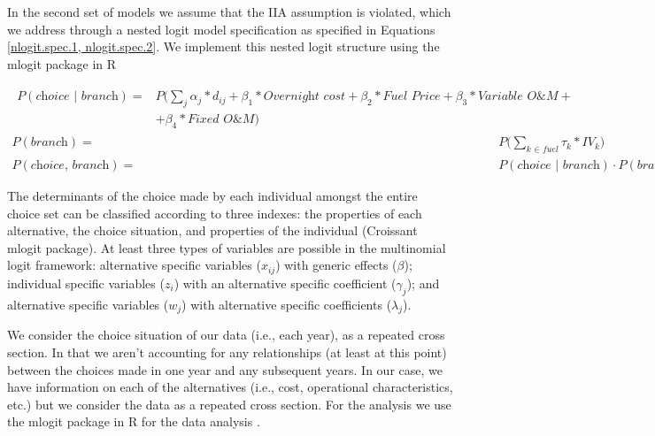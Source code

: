 \documentclass[10pt]{amsart}
\begin{document}
In the second set of models we assume that the IIA assumption is violated, which we address through a nested logit model specification as specified in Equations \ref{nlogit.spec.1, nlogit.spec.2}.
We implement this nested logit structure using the mlogit package in R \parencite{mlogit2013}


\begin{align}
\begin{split}\label{eq:1}
    P(\textit{choice $|$ branch})  ={}& P\Big(\sum_j \alpha_{j}*d_{ij} +\beta_1*\textit{Overnight cost} + \beta_2*\textit{Fuel Price} + \beta_3*\textit{Variable O\&M} + \\
         & + \beta_4*\textit{Fixed O\&M} \Big)
\end{split}\\
    P(\textit{branch}) ={}& P\Big(\sum_{\textit{k $\in$ fuel}} \tau_{k}*IV_{k}\Big) \\ 
    P(\textit{choice, branch}) ={}& P(\textit{choice $|$ branch})\cdot P(\textit{branch})
\end{align}

The determinants of the choice made by each individual amongst the entire choice set can be classified according to three indexes: the properties of each alternative, the choice situation, and properties of the individual \cite{}(Croissant mlogit package).
At least three types of variables are possible in the multinomial logit framework: alternative specific variables ($x_{ij}$) with generic effects ($\beta$); individual specific variables ($z_i$) with an alternative specific coefficient ($\gamma_j$); and alternative specific variables ($w_j$) with alternative specific coefficients ($\lambda_j$)\parencite{mlogit2013}.  

We consider the choice situation of our data (i.e., each year), as a repeated cross section. 
In that we aren't accounting for any relationships (at least at this point) between the choices made in one year and any subsequent years.  
In our case, we have information on each of the alternatives (i.e., cost, operational characteristics, etc.) but we consider the data as a repeated cross section. 
For the analysis we use the mlogit package in R for the data analysis \parencite{mlogit2013}. 
 
\end{document}
